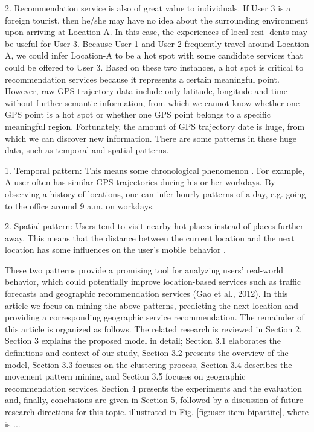 \documentclass[conference]{IEEEtran}
\begin{document}
  2. Recommendation service is also of great value to individuals. If User 3 is a foreign tourist, then he/she may have no idea about the surrounding
environment upon arriving at Location A. In this case, the experiences of local resi- dents may be useful for User 3. Because User 1 and User 2
frequently travel around Location A, we could infer Location-A to be a hot spot with some candidate services that could be offered to User 3.
Based on these two instances, a hot spot is critical to recommendation services because it represents a certain meaningful point. However, raw GPS trajectory data include only latitude, longitude and time without further semantic information, from which we cannot know whether one GPS point is a hot spot or whether one GPS point belongs to a specific meaningful region. Fortunately, the amount of GPS trajectory date is huge, from which we can discover new information. There are some patterns in these huge data, such as temporal and spatial patterns.

  1. Temporal pattern: This means some chronological phenomenon . For example, A user often has similar GPS trajectories during his or her workdays.
By observing a history of locations, one can infer hourly patterns of a day, e.g. going to the office around 9 a.m. on workdays. 

  2. Spatial pattern: Users tend to visit nearby hot places instead of places further away. This means that the distance between the current location and
the next location has some influences on the user’s mobile behavior  . 

  These two patterns provide a promising tool for analyzing users’ real-world behavior, which could potentially 
improve location-based services such as traffic forecasts and geographic recommendation services (Gao et al., 2012).
In this article we focus on mining the above patterns, predicting the next location and providing a corresponding geographic service recommendation.
The remainder of this article is organized as follows. The related research is reviewed in Section 2. Section 3 explains the proposed model in detail;
Section 3.1 elaborates the definitions and context of our study, Section 3.2 presents the overview of the model, Section 3.3 focuses on the clustering
process, Section 3.4 describes the movement pattern mining, and Section 3.5 focuses on geographic recommendation services. Section 4 presents the
experiments and the evaluation and, finally, conclusions are given in Section 5, followed by a discussion of future research directions for this topic.
illustrated in Fig. \ref{fig:user-item-bipartite}, where is ...
\end{document}
